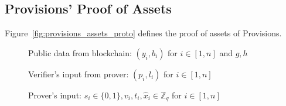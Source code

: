 \subsection{Provisions' Proof of Assets}\label{subsec:provisions-assets-proof}

Figure~\ref{fig:provisions_assets_proto} defines the proof of assets of Provisions.

\begin{figure}[h]
\begin{mdframed}
        Public data from blockchain: $(y_i, b_i)$ for $i \in [1, n]$ and $g, h$

        Verifier's input from prover: $(p_i, l_i)$ for $i \in [1, n]$

        Prover's input: $s_i \in \{0, 1\}, v_i,t_i,\hat{x}_i \in \mathbb{Z}_q$ for $i \in [1, n]$


\end{mdframed}
\end{figure}
